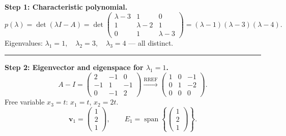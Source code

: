 \documentclass[12pt,a3paper]{article}
\begin{document}
\begin{tcolorbox}[enhanced,breakable,
  colback=cE!4,colframe=cE,boxrule=0.8pt,arc=5pt,
  title={\textbf{Answer --- Eigenvalues, Eigenvectors \& Eigenspaces of
    $A=\begin{pmatrix}3&-1&0\\-1&2&-1\\0&-1&3\end{pmatrix}$}},
  fonttitle=\bfseries\color{white},colbacktitle=cE]

\textbf{Step 1: Characteristic polynomial.}
\[
  p(\lambda) = \det(\lambda I - A)
  = \det\begin{pmatrix}\lambda-3&1&0\\1&\lambda-2&1\\0&1&\lambda-3\end{pmatrix}
  = (\lambda-1)(\lambda-3)(\lambda-4).
\]
Eigenvalues: $\boxed{\lambda_1=1,\quad\lambda_2=3,\quad\lambda_3=4}$ — all distinct.

\medskip\textcolor{cE}{\rule{\textwidth}{0.4pt}}

\textbf{Step 2: Eigenvector and eigenspace for $\lambda_1=1$.}
\[
  A-I = \begin{pmatrix}2&-1&0\\-1&1&-1\\0&-1&2\end{pmatrix}
  \xrightarrow{\text{RREF}}
  \begin{pmatrix}1&0&-1\\0&1&-2\\0&0&0\end{pmatrix}.
\]
Free variable $x_3=t$: $x_1=t$, $x_2=2t$.
\[
  \mathbf{v}_1=\begin{pmatrix}1\\2\\1\end{pmatrix}, \qquad
  E_1 = \operatorname{span}\!\left\{\begin{pmatrix}1\\2\\1\end{pmatrix}\right\}.
\]


\end{tcolorbox}
\end{document}
